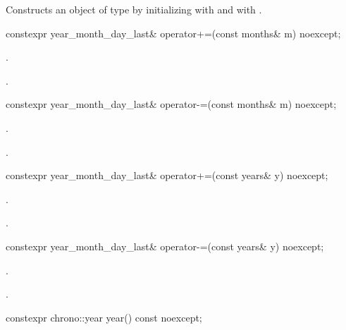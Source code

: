 \begin{itemdescr}
\pnum
\effects
Constructs an object of type  by
initializing  with  and  with .
\end{itemdescr}

%
\begin{itemdecl}
constexpr year_month_day_last& operator+=(const months& m) noexcept;
\end{itemdecl}

\begin{itemdescr}
\pnum
\effects
{}.

\pnum
\returns
{}.
\end{itemdescr}

%
\begin{itemdecl}
constexpr year_month_day_last& operator-=(const months& m) noexcept;
\end{itemdecl}

\begin{itemdescr}
\pnum
\effects
{}.

\pnum
\returns
{}.
\end{itemdescr}

%
\begin{itemdecl}
constexpr year_month_day_last& operator+=(const years& y) noexcept;
\end{itemdecl}

\begin{itemdescr}
\pnum
\effects
{}.

\pnum
\returns
{}.
\end{itemdescr}

%
\begin{itemdecl}
constexpr year_month_day_last& operator-=(const years& y) noexcept;
\end{itemdecl}

\begin{itemdescr}
\pnum
\effects
{}.

\pnum
\returns
{}.
\end{itemdescr}

%
\begin{itemdecl}
constexpr chrono::year year() const noexcept;
\end{itemdecl}

